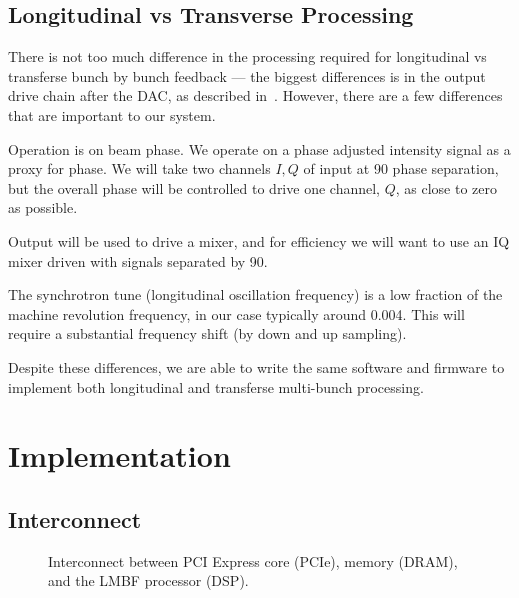 \documentclass[
    a4paper,
    keeplastbox,            %
    hyphens,                %
    nospread,               %
]{jacow}
\begin{document}
\subsection{Longitudinal vs Transverse Processing}

There is not too much difference in the processing required for longitudinal vs
transferse bunch by bunch feedback --- the biggest differences is in the output
drive chain after the DAC, as described in~\cite{ibic2016}.  However, there are
a few differences that are important to our system.

\begin{Itemize}
\item
    Operation is on beam phase.  We operate on a phase adjusted intensity signal
    as a proxy for phase.  We will take two channels $I,Q$ of input at
    90\textdegree{} phase separation, but the overall phase will be controlled
    to drive one channel, $Q$, as close to zero as possible.
\item
    Output will be used to drive a mixer, and for efficiency we will want to use
    an IQ mixer driven with signals separated by 90\textdegree{}.
\item
    The synchrotron tune (longitudinal oscillation frequency) is a low fraction
    of the machine revolution frequency, in our case typically around 0.004.
    This will require a substantial frequency shift (by down and up sampling).
\end{Itemize}

Despite these differences, we are able to write the same software and firmware
to implement both longitudinal and transferse multi-bunch processing.



\section{Implementation}


\subsection{Interconnect}

\begin{figure}
\begin{centering}

\end{centering}
\caption{Interconnect between PCI Express core (PCIe), memory (DRAM), and the
LMBF processor (DSP).}
\label{interconnect}
\end{figure}
\end{document}
